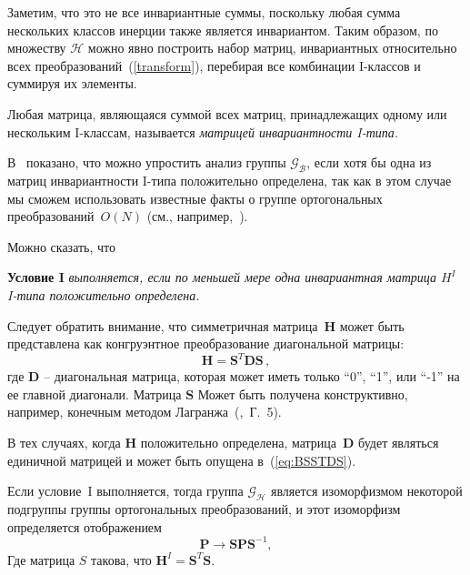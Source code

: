 Заметим, что это не все инвариантные суммы, поскольку любая сумма нескольких классов инерции также является инвариантом. Таким образом, по множеству $ {\mathcal{H}} $ можно явно построить набор матриц, инвариантных относительно всех преобразований~(\ref {transform}), перебирая все комбинации I-классов и суммируя их элементы.

\begin{definition}
Любая матрица, являющаяся суммой всех матриц, принадлежащих одному или нескольким I-классам, называется {\em матрицей инвариантности I-типа.}
\end{definition}


В~\cite{yurkov:symmetry} показано, что можно упростить анализ группы $\mathcal{G}_{\mathcal{B}}$, если хотя бы одна из матриц инвариантности I-типа положительно определена, так как в этом случае мы сможем использовать известные факты о группе ортогональных преобразований~$O(N)$ (см., например,~\cite{Zhelobenko}).

Можно сказать, что

\textbf{Условие I} {\em выполняется, если по меньшей мере одна инвариантная матрица $H^I$ I-типа положительно определена.}

Следует обратить внимание, что симметричная матрица~$\textbf{H}$ может быть представлена как конгруэнтное преобразование диагональной матрицы:
%
\begin{equation}
\label{eq:BSSTDS}
\textbf{H}=\textbf{S}^T\textbf{DS} \, ,
\end{equation}
%
где $\textbf{D}$ -- диагональная матрица, которая может иметь только ``0'', ``1'', или ``-1'' на ее главной диагонали. Матрица $\textbf{S}$ Может быть получена конструктивно, например, конечным методом Лагранжа~(\cite{Lancaster},~Г.~5).

В тех случаях, когда $\textbf{H}$ положительно определена, матрица~$\textbf{D}$ будет являться единичной матрицей и может быть опущена в~(\ref{eq:BSSTDS}).

\begin{proposition} \label{prop:orthogonal} Если условие~I выполняется, тогда группа $ {\mathcal{G}}_{\mathcal{H}} $ является изоморфизмом некоторой подгруппы группы ортогональных преобразований, и этот изоморфизм определяется отображением
\begin{equation}
\label{eq:Qdef_map}
\textbf{P} \to \textbf{SPS}^{-1},
\end{equation}
Где матрица $S$ такова, что $\textbf{H}^I=\textbf{S}^T \textbf{S}.$
\end{proposition}

